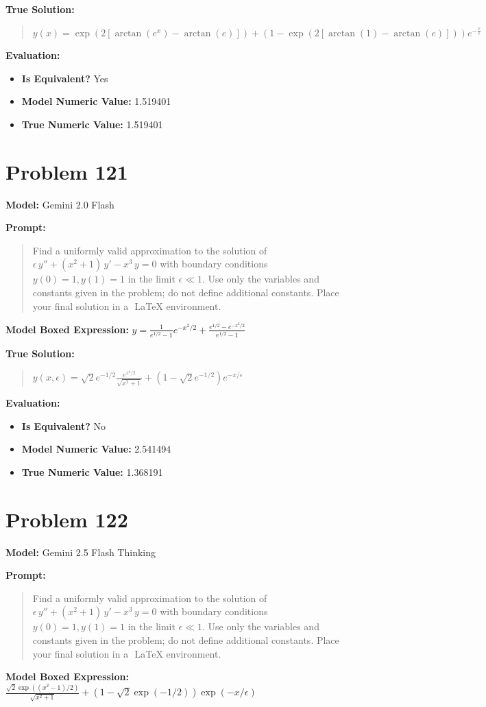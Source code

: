 \documentclass{article}
\begin{document}
{\textbf{True Solution:}
\begin{quote}
$y(x) = \exp (2[\arctan(e^x) - \arctan(e)]) + (1 - \exp (2[\arctan(1) - \arctan(e)]))e^{-\frac{x}{\epsilon}}$
\end{quote}

\textbf{Evaluation:}
\begin{itemize}
\item \textbf{Is Equivalent?} Yes
\item \textbf{Model Numeric Value:} 1.519401
\item \textbf{True Numeric Value:} 1.519401
\end{itemize}
\vspace{1cm}
\section*{Problem 121}
\textbf{Model:} Gemini 2.0 Flash

\textbf{Prompt:}
\begin{quote}
Find a uniformly valid approximation to the solution of $\epsilon\,y'' + (x^2+1)\,y' - x^3\,y = 0$ with boundary conditions $y(0)=1, y(1)=1$ in the limit $\epsilon \ll 1$. Use only the variables and constants given in the problem; do not define additional constants. Place your final solution in a $\boxed{}$ LaTeX environment.
\end{quote}
\textbf{Model Boxed Expression:} $y = \frac{1}{e^{1/2}-1}e^{-x^2/2} + \frac{e^{1/2} - e^{-x^2/2}}{e^{1/2} - 1}$

\textbf{True Solution:}
\begin{quote}
$y(x, \epsilon) = \sqrt{2}e^{-1/2} \frac{e^{x^2/2}}{\sqrt{x^2+1}} + \left( 1 - \sqrt{2}e^{-1/2} \right) e^{-x/\epsilon}$
\end{quote}

\textbf{Evaluation:}
\begin{itemize}
\item \textbf{Is Equivalent?} No
\item \textbf{Model Numeric Value:} 2.541494
\item \textbf{True Numeric Value:} 1.368191
\end{itemize}
\vspace{1cm}
\section*{Problem 122}
\textbf{Model:} Gemini 2.5 Flash Thinking

\textbf{Prompt:}
\begin{quote}
Find a uniformly valid approximation to the solution of $\epsilon\,y'' + (x^2+1)\,y' - x^3\,y = 0$ with boundary conditions $y(0)=1, y(1)=1$ in the limit $\epsilon \ll 1$. Use only the variables and constants given in the problem; do not define additional constants. Place your final solution in a $\boxed{}$ LaTeX environment.
\end{quote}
\textbf{Model Boxed Expression:} $\frac{\sqrt{2}\exp((x^2-1)/2)}{\sqrt{x^2+1}} + \left(1-\sqrt{2}\exp(-1/2)\right)\exp(-x/\epsilon)$

}
\end{document}
